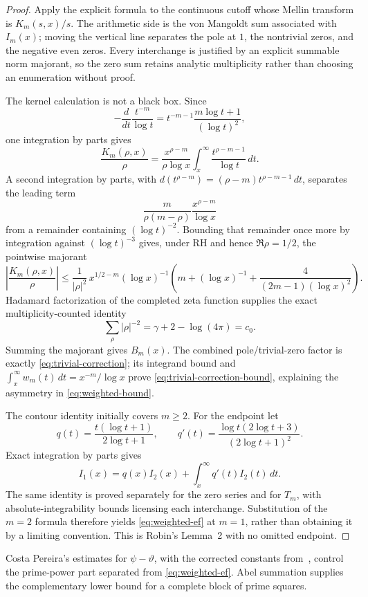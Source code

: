 \documentclass[11pt]{amsart}
\theoremstyle{definition}
\theoremstyle{remark}
\numberwithin{equation}{section}
\newcommand{\RH}{\mathrm{RH}}
\newcommand{\euler}{\gamma}
\begin{document}
\begin{proof}
Apply the explicit formula to the continuous cutoff whose Mellin transform
is $K_m(s,x)/s$.  The arithmetic side is the von Mangoldt sum associated
with $I_m(x)$; moving the vertical line separates the pole at $1$, the
nontrivial zeros, and the negative even zeros.  Every interchange is
justified by an explicit summable norm majorant, so the zero sum retains
analytic multiplicity rather than choosing an enumeration without proof.

The kernel calculation is not a black box.  Since
\[
 -\frac{d}{dt}\frac{t^{-m}}{\log t}
 =t^{-m-1}\frac{m\log t+1}{(\log t)^2},
\]
one integration by parts gives
\begin{equation}\label{eq:kernel-first-parts}
 \frac{K_m(\rho,x)}{\rho}
 =\frac{x^{\rho-m}}{\rho\log x}
  \int_x^\infty\frac{t^{\rho-m-1}}{\log t}\,dt.
\end{equation}
A second integration by parts, with
$d(t^{\rho-m})=(\rho-m)t^{\rho-m-1}\,dt$, separates the leading term
\[
 \frac{m}{\rho(m-\rho)}
 \frac{x^{\rho-m}}{\log x}
\]
from a remainder containing $(\log t)^{-2}$.  Bounding that remainder once
more by integration against $(\log t)^{-3}$ gives, under
$\RH$ and hence $\Re\rho=1/2$, the pointwise majorant
\[
 \left|\frac{K_m(\rho,x)}{\rho}\right|
 \le \frac1{|\rho|^2}\,
 x^{1/2-m}(\log x)^{-1}
 \left(m+(\log x)^{-1}
       +\frac4{(2m-1)(\log x)^2}\right).
\]
Hadamard factorization of the completed zeta function supplies the exact
multiplicity-counted identity
\[
  \sum_{\rho}|\rho|^{-2}=\euler+2-\log(4\pi)=c_0.
\]
Summing the majorant gives $B_m(x)$.  The combined pole/trivial-zero factor
is exactly \eqref{eq:trivial-correction}; its integrand bound and
$\int_x^\infty w_m(t)\,dt=x^{-m}/\log x$ prove
\eqref{eq:trivial-correction-bound}, explaining the asymmetry in
\eqref{eq:weighted-bound}.

The contour identity initially covers $m\ge2$.  For the endpoint let
\[
 q(t)=\frac{t(\log t+1)}{2\log t+1},\qquad
 q'(t)=\frac{\log t(2\log t+3)}{(2\log t+1)^2}.
\]
Exact integration by parts gives
\[
 I_1(x)=q(x)I_2(x)+\int_x^\infty q'(t)I_2(t)\,dt.
\]
The same identity is proved separately for the zero series and for
$T_m$, with absolute-integrability bounds licensing each interchange.
Substitution of the $m=2$ formula therefore yields \eqref{eq:weighted-ef}
at $m=1$, rather than obtaining it by a limiting convention.  This is
Robin's Lemma~2 with no omitted endpoint.
\end{proof}

Costa Pereira's estimates for $\psi-\vartheta$, with the corrected constants
from~\cite{CostaPereira1987}, control the prime-power part separated from
\eqref{eq:weighted-ef}.  Abel summation supplies the complementary lower
bound for a complete block of prime squares.
\end{document}

